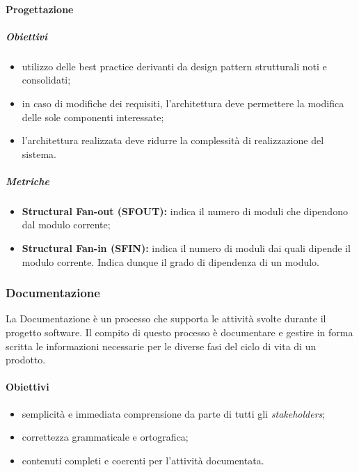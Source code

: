 \paragraph{Progettazione}
\subparagraph{Obiettivi}
\begin{itemize}
	\item utilizzo delle best practice derivanti da design pattern strutturali noti e consolidati;
	\item in caso di modifiche dei requisiti, l'architettura deve permettere la modifica delle sole componenti interessate;
	\item l'architettura realizzata deve ridurre la complessità di realizzazione del sistema.
\end{itemize}
\subparagraph{Metriche}
\begin{itemize}
	\item \textbf{Structural Fan-out (SFOUT):} indica il numero di moduli che dipendono dal modulo corrente;
	\item \textbf{Structural Fan-in (SFIN):} indica il numero di moduli dai quali dipende il modulo corrente. Indica dunque il grado di dipendenza di un modulo.
\end{itemize}

\subsubsection{Documentazione}
La Documentazione è un processo che supporta le attività svolte durante il progetto software. Il compito di questo processo è documentare e gestire in forma scritta le informazioni necessarie per le diverse fasi del ciclo di vita di un prodotto.
\paragraph{Obiettivi}
\begin{itemize}
	\item semplicità e immediata comprensione da parte di tutti gli \textit{stakeholders\glo};
	\item correttezza grammaticale e ortografica;
	\item contenuti completi e coerenti per l'attività documentata.
\end{itemize}
